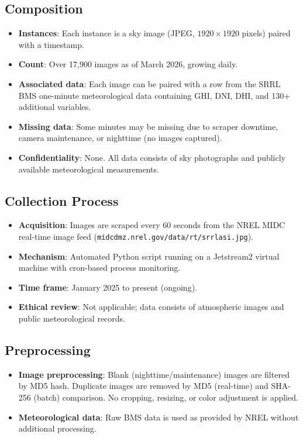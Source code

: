 \documentclass[twoside,11pt]{article}
\begin{document}
\subsection*{Composition}
\begin{itemize}
    \item \textbf{Instances}: Each instance is a sky image (JPEG, $1920 \times 1920$ pixels) paired with a timestamp.
    \item \textbf{Count}: Over 17,900 images as of March 2026, growing daily.
    \item \textbf{Associated data}: Each image can be paired with a row from the SRRL BMS one-minute meteorological data containing GHI, DNI, DHI, and 130+ additional variables.
    \item \textbf{Missing data}: Some minutes may be missing due to scraper downtime, camera maintenance, or nighttime (no images captured).
    \item \textbf{Confidentiality}: None. All data consists of sky photographs and publicly available meteorological measurements.
\end{itemize}

\subsection*{Collection Process}
\begin{itemize}
    \item \textbf{Acquisition}: Images are scraped every 60 seconds from the NREL MIDC real-time image feed (\texttt{midcdmz.nrel.gov/data/rt/srrlasi.jpg}).
    \item \textbf{Mechanism}: Automated Python script running on a Jetstream2 virtual machine with cron-based process monitoring.
    \item \textbf{Time frame}: January 2025 to present (ongoing).
    \item \textbf{Ethical review}: Not applicable; data consists of atmospheric images and public meteorological records.
\end{itemize}

\subsection*{Preprocessing}
\begin{itemize}
    \item \textbf{Image preprocessing}: Blank (nighttime/maintenance) images are filtered by MD5 hash. Duplicate images are removed by MD5 (real-time) and SHA-256 (batch) comparison. No cropping, resizing, or color adjustment is applied.
    \item \textbf{Meteorological data}: Raw BMS data is used as provided by NREL without additional processing.
\end{itemize}
\end{document}
